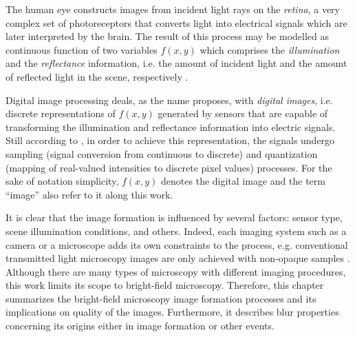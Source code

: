 










The human eye constructs images from incident light rays on the \emph{retina}, a very complex set of photoreceptors that converts light into electrical signals which are later interpreted by the brain. The result of this process may be modelled as continuous function of two variables $f(x,y)$ which comprises the \emph{illumination} and the \emph{reflectance} information, i.e. the amount of incident light and the amount of reflected light in the scene, respectively \cite{gonzalez2018digital}.

Digital image processing deals, as the name proposes, with \emph{digital images}, i.e. discrete representations of $f(x,y)$ generated by sensors that are capable of transforming the illumination and reflectance information into electric signals. Still according to , in order to achieve this representation, the signals undergo sampling (signal conversion from continuous to discrete) and quantization (mapping of real-valued intensities to discrete pixel values) processes. For the sake of notation simplicity, $f(x,y)$ denotes the digital image and the term ``image'' also refer to it along this work.

It is clear that the image formation is influenced by several factors: sensor type, scene illumination conditions, and others. Indeed, each imaging system such as a camera or a microscope adds its own constraints to the process, e.g. conventional transmitted light microscopy images are only achieved with non-opaque samples \cite{rudi2020contrast}. Although there are many types of microscopy with different imaging procedures, this work limits its scope to bright-field microscopy. Therefore, this chapter summarizes the bright-field microscopy image formation processes and its implications on quality of the images. Furthermore, it describes blur properties concerning its origins either in image formation or other events. 


